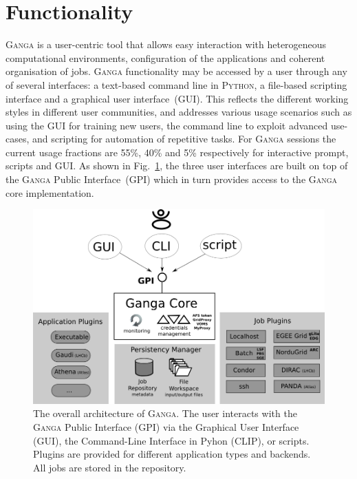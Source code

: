 \documentclass{elsart}
\def\ganga {\textsc{Ganga}\xspace}
\def\python {\textsc{Python}\xspace}
\def\GPI{GPI\xspace}
\begin{document}
\section{Functionality}
\label{sec:functionality}
\ganga is a user-centric tool that allows easy interaction with heterogeneous
computational environments, configuration of the applications and coherent
organisation of jobs. \ganga functionality may be accessed by a user through
any of several interfaces: a text-based command line in \python, a file-based
scripting interface and a graphical user interface~(GUI). This reflects the different
working styles in different user communities, and addresses various usage
scenarios such as using the GUI for training new users, the command line to
exploit advanced use-cases, and scripting for automation of repetitive tasks.
For \ganga sessions the current usage fractions are 55\%, 40\% and 5\%
respectively for interactive prompt, scripts and GUI. As shown in
Fig.~\ref{fig:GPI_architecture}, the three user interfaces are built on top of
the \ganga Public Interface~(\GPI) which in turn provides access to the \ganga
core implementation.
\begin{figure}[htbp]
  \centering
  \includegraphics[width=14cm]{ganga-architecture.png}
  \caption{The overall architecture of \ganga. The user interacts with the
    \ganga Public Interface (GPI) via the Graphical User Interface (GUI), the
    Command-Line Interface in Pyhon (CLIP), or
    scripts. Plugins are provided for different application types and
    backends. All jobs are stored in the
    repository.}
  \label{fig:GPI_architecture}
\end{figure}
\end{document}
